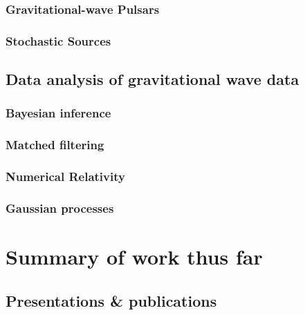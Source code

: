 \documentclass{kentigern}
\begin{document}
\section{Gravitational-wave Pulsars}
\label{sec:pulsar}


\section{Stochastic Sources}
\label{sec:stochastic-sources}


\chapter{Data analysis of gravitational wave data}
\label{cha:data-analys-grav}


\section{Bayesian inference}
\label{sec:bayesian-inference}


\section{Matched filtering}
\label{sec:matched-filtering}


\section{Numerical Relativity}
\label{sec:numerical-relativity}



\section{Gaussian processes}
\label{sec:gaussian-process}


\part{Summary of work thus far}
\label{part:work}

\chapter{Presentations \& publications}
\label{chap:pandp} \newpage
\end{document}
